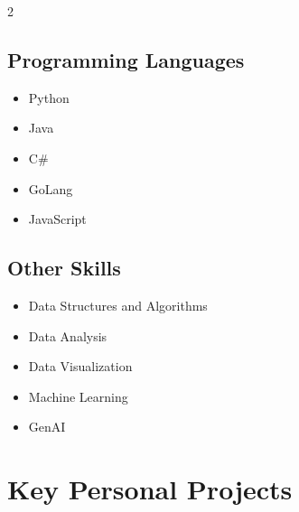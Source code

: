\documentclass[a4paper,12pt]{article}
\begin{document}
\begin{multicols}{2}

    \subsection*{Programming Languages}
    \begin{itemize}[nosep, leftmargin=1.5em]
        \item Python
        \item Java
        \item C\#
        \item GoLang
        \item JavaScript
    \end{itemize}

    \subsection*{Other Skills}
    \begin{itemize}[nosep, leftmargin=1.5em]
        \item Data Structures and Algorithms 
        \item Data Analysis
        \item Data Visualization
        \item Machine Learning
        \item GenAI
    \end{itemize}
    
\end{multicols}

\section{Key Personal Projects}
\end{document}
